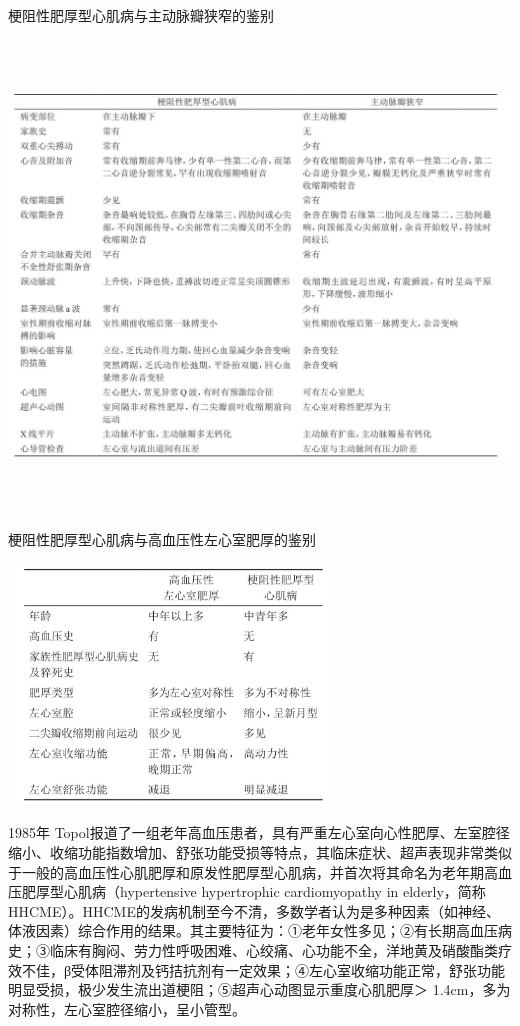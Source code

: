\begin{table}[htbp]
\centering
\caption{梗阻性肥厚型心肌病与主动脉瓣狭窄的鉴别}
\label{tab106-1}
\includegraphics[width=6.73958in,height=4.91667in]{./images/Image00473.jpg}
\end{table}

\begin{table}[htbp]
\centering
\caption{梗阻性肥厚型心肌病与高血压性左心室肥厚的鉴别}
\label{tab106-2}
\includegraphics[width=3.375in,height=2.51042in]{./images/Image00474.jpg}
\end{table}

1985年
Topol报道了一组老年高血压患者，具有严重左心室向心性肥厚、左室腔径缩小、收缩功能指数增加、舒张功能受损等特点，其临床症状、超声表现非常类似于一般的高血压性心肌肥厚和原发性肥厚型心肌病，并首次将其命名为老年期高血压肥厚型心肌病（hypertensive
hypertrophic cardiomyopathy in
elderly，简称HHCME）。HHCME的发病机制至今不清，多数学者认为是多种因素（如神经、体液因素）综合作用的结果。其主要特征为：①老年女性多见；②有长期高血压病史；③临床有胸闷、劳力性呼吸困难、心绞痛、心功能不全，洋地黄及硝酸酯类疗效不佳，β受体阻滞剂及钙拮抗剂有一定效果；④左心室收缩功能正常，舒张功能明显受损，极少发生流出道梗阻；⑤超声心动图显示重度心肌肥厚＞
1.4cm，多为对称性，左心室腔径缩小，呈小管型。

